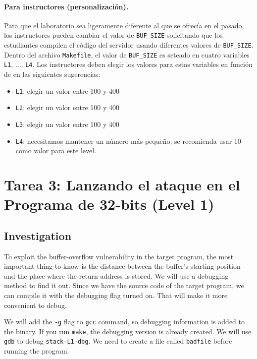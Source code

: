 \paragraph{Para instructores (personalización).}
Para que el laboratorio sea ligeramente diferente al que se ofrecía en el pasado,
los instructores pueden cambiar el valor de \texttt{BUF\_SIZE} solicitando
que los estudiantes compilen el código del servidor usando diferentes valores de \texttt {BUF\_SIZE}.
Dentro del archivo \texttt{Makefile}, el valor de \texttt{BUF\_SIZE} es seteado en 
cuatro variables \texttt{L1}, ..., \texttt{L4}.
Los instructores deben elegir los valores para estas variables en función de
en las siguientes sugerencias:

\begin{itemize}[noitemsep]
\item \texttt{L1}: elegir un valor entre 100 y 400
\item \texttt{L2}: elegir un valor entre 100 y 400
\item \texttt{L3}: elegir un valor entre 100 y 400
\item \texttt{L4}: necesitamos mantener un número más pequeño, se recomienda usar 10 como valor para este level.
\end{itemize}
 


\section{Tarea 3: Lanzando el ataque en el Programa de 32-bits (Level 1)}

\subsection{Investigation} 

To exploit the buffer-overflow vulnerability in the target program,
the most important thing to know is the distance between the 
buffer's starting position and the place where the return-address
is stored. We will use a debugging method to find it out.
Since we have the source code of the target program, we
can compile it with the debugging flag turned on. That will make it more
convenient to debug. 

We will add the \texttt{-g} flag to \texttt{gcc} command, so debugging information
is added to the binary. If you run \texttt{make}, the debugging version
is already created. We will use \texttt{gdb} to debug \texttt{stack-L1-dbg}.  
We need to create a file called
\texttt{badfile} before running the program. 


